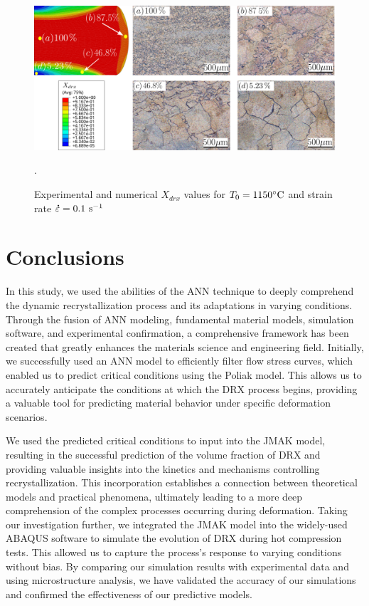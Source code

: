 \documentclass[metals,article,submit,pdftex,moreauthors]{Definitions/mdpi}
\DeclareRobustCommand{\mdot}[1]{\accentset{\mbox{\bfseries .}}{#1}}
\DeclareRobustCommand{\ps}{\text{s}^{-1}}
\begin{document}
\begin{figure}[H]
\centering
\includegraphics[width=0.98\columnwidth]{Figures/drxExpNum}
\caption{Experimental and numerical $X_{drx}$ values for $T_0=1150\celsius$ and strain rate $\mdot{\varepsilon}=0.1~\ps$}.
\label{fig:expNumDRX}
\end{figure}

\section{Conclusions\label{sec:Conclusions}}

In this study, we used the abilities of the ANN technique to deeply comprehend the dynamic recrystallization process and its adaptations in varying conditions.
Through the fusion of ANN modeling, fundamental material models, simulation software, and experimental confirmation, a comprehensive framework has been created that greatly enhances the materials science and engineering field.
Initially, we successfully used an ANN model to efficiently filter flow stress curves, which enabled us to predict critical conditions using the Poliak model.
This allows us to accurately anticipate the conditions at which the DRX process begins, providing a valuable tool for predicting material behavior under specific deformation scenarios.

We used the predicted critical conditions to input into the JMAK model, resulting in the successful prediction of the volume fraction of DRX and providing valuable insights into the kinetics and mechanisms controlling recrystallization.
This incorporation establishes a connection between theoretical models and practical phenomena, ultimately leading to a more deep comprehension of the complex processes occurring during deformation.
Taking our investigation further, we integrated the JMAK model into the widely-used ABAQUS software to simulate the evolution of DRX during hot compression tests.
This allowed us to capture the process's response to varying conditions without bias.
By comparing our simulation results with experimental data and using microstructure analysis, we have validated the accuracy of our simulations and confirmed the effectiveness of our predictive models.
\end{document}
